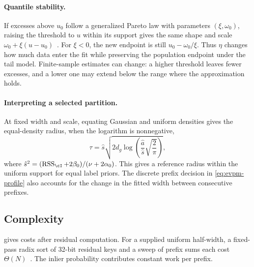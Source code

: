 \documentclass[10pt,twocolumn,letterpaper]{article}
\DeclareMathOperator{\RSS}{RSS}
\newcommand{\ahat}{\hat a}
\begin{document}
\paragraph{Quantile stability.}
If excesses above $u_0$ follow a generalized Pareto law with parameters
$(\xi,\omega_0)$, raising the threshold to $u$ within its support gives
the same shape and scale $\omega_0+\xi(u-u_0)$~\cite{Coles2001}. For
$\xi<0$, the new endpoint is still $u_0-\omega_0/\xi$. Thus $\eta$
changes how much data enter the fit while preserving the population
endpoint under the tail model. Finite-sample estimates can change:
a higher threshold leaves fewer excesses, and a lower one may extend
below the range where the approximation holds.

\paragraph{Interpreting a selected partition.}
At fixed width and scale, equating Gaussian and uniform densities gives
the equal-density radius, when the logarithm is nonnegative,
\begin{equation}
 \tau=\hat s\sqrt{2d_g\log\!\left(\frac{\ahat}{\hat s}
                         \sqrt{\frac{2}{\pi}}\right)},
 \label{eq:implicit-threshold}
\end{equation}
where $\hat s^2=(\RSS_\cI+2\beta_0)/(\nu+2\alpha_0)$.
This gives a reference radius within the uniform support for equal label priors. The discrete
prefix decision in \cref{eq:evpm-profile} also accounts for the change
in the fitted width between consecutive prefixes.

\subsection{Complexity}
\label{sec:complexity}

 gives costs after residual computation. For a
supplied uniform half-width, a fixed-pass radix sort of 32-bit residual
keys and a sweep of prefix sums each cost $\Theta(N)$~\cite{Pritts2026}.
The inlier probability contributes constant work per prefix.
\end{document}

